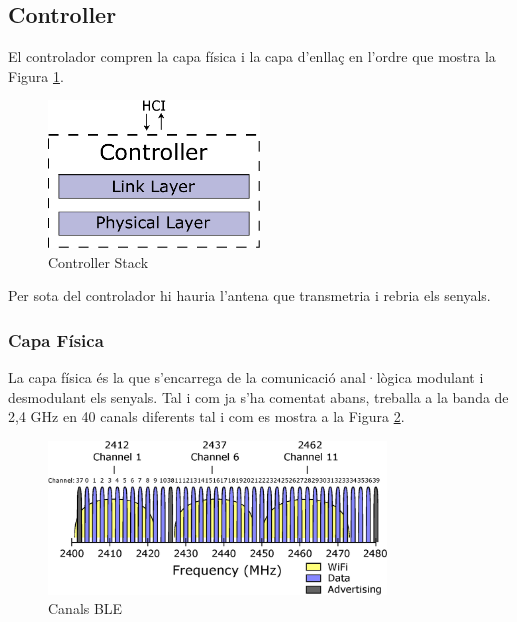 \subsection{Controller}
El controlador compren la capa física i la capa d'enllaç en l'ordre que mostra la Figura \ref{controller_stack}.

\begin{figure}[h!]
	\begin{center}
		\includegraphics[width=0.5\textwidth]{./diagrames/BLE_Controller}
		\caption{Controller Stack}
		\label{controller_stack}
	\end{center}
\end{figure}

Per sota del controlador hi hauria l'antena que transmetria i rebria els senyals.

\subsubsection{Capa Física}
La capa física és la que s'encarrega de la comunicació anal·lògica modulant i desmodulant els senyals.
Tal i com ja s'ha comentat abans, treballa a la banda de 2,4 GHz en 40 canals diferents tal i com es mostra a la Figura \ref{BLE_Channels}.

\begin{figure}[hb]
	\begin{center}
		\includegraphics[width=0.8\textwidth]{./diagrames/BLE_WiFi}
		\caption{Canals BLE \cite{ble_feq}}
		\label{BLE_Channels}
	\end{center}
\end{figure}

